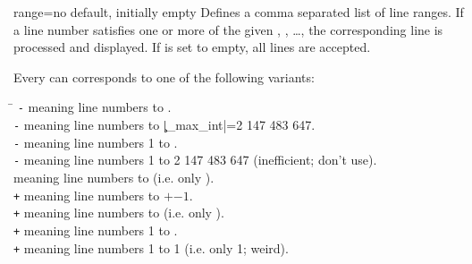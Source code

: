 \documentclass[a4paper,11pt]{ltxdoc}
\begin{document}
\begin{docCsvKey}[][doc new and updated={2021-06-29}{2022-09-21}]{range}{=}{no default, initially empty}
  Defines a comma separated list of line ranges. If a line number 
  satisfies one or more of the given , , \ldots,
  the corresponding line is processed and displayed.
  If  is set to empty, all lines are accepted.

  Every  can
  corresponds to one of the following variants:
  \begin{tabbing}
  \hspace*{2cm}\=\kill
  \texttt{-} \> meaning line numbers  to .\\
  \texttt{-}         \> meaning line numbers  to |\c_max_int|=2 147 483 647.\\
  \texttt{-}         \> meaning line numbers 1 to .\\
  \texttt{-}                 \> meaning line numbers 1 to 2 147 483 647 (inefficient; don't use).\\
  \texttt{}          \> meaning line numbers  to  (i.e. only ).\\
  \texttt{+} \> meaning line numbers  to $+$$-1$.\\
  \texttt{+}         \> meaning line numbers  to  (i.e. only ).\\
  \texttt{+}         \> meaning line numbers 1 to .\\
  \texttt{+}                 \> meaning line numbers 1 to 1 (i.e. only 1; weird).\\
  \end{tabbing}

\begin{dispExample}
\end{dispExample}


\begin{dispExample}
\end{dispExample}



\end{docCsvKey}
\end{document}
